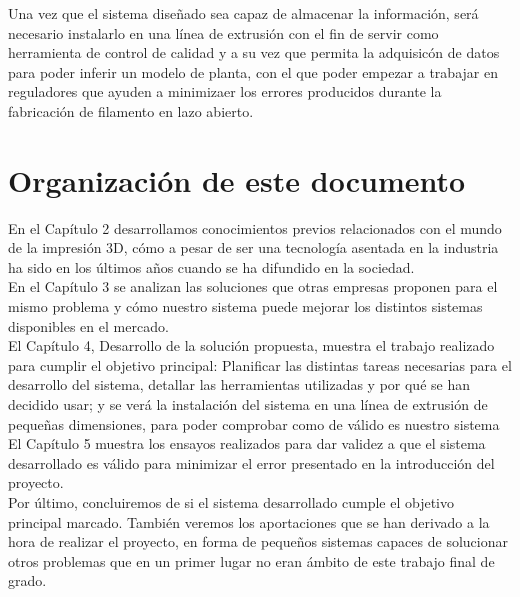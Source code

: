 Una vez que el sistema diseñado sea capaz de almacenar la información, será necesario instalarlo en una línea de extrusión con el fin de servir como herramienta de control de calidad y a su vez que permita la adquisicón de datos para poder inferir un modelo de planta, con el que poder empezar a trabajar en reguladores que ayuden a minimizaer los errores producidos durante la fabricación de filamento en lazo abierto.\\
\newpage
\section{Organización de este documento}
\label{sec:organizacion}

En el Capítulo 2 desarrollamos conocimientos previos relacionados con el mundo de la impresión 3D, cómo a pesar de ser una tecnología asentada en la industria ha sido en los últimos años cuando se ha difundido en la sociedad.\\

En el Capítulo 3 se analizan las soluciones que otras empresas proponen para el mismo problema y cómo nuestro sistema puede mejorar los distintos sistemas disponibles en el mercado.\\

El Capítulo 4, Desarrollo de la solución propuesta, muestra el trabajo realizado para cumplir el objetivo principal: Planificar las distintas tareas necesarias para el desarrollo del sistema, detallar las herramientas utilizadas y por qué se han decidido usar; y se verá la instalación del sistema en una línea de extrusión de pequeñas dimensiones, para poder comprobar como de válido es nuestro sistema\\

El Capítulo 5 muestra los ensayos realizados para dar validez a que el sistema desarrollado es válido para minimizar el error presentado en la introducción del proyecto.\\

Por último, concluiremos de si el sistema desarrollado cumple el objetivo principal marcado. También veremos los aportaciones que se han derivado a la hora de realizar el proyecto, en forma de pequeños sistemas capaces de solucionar otros problemas que en un primer lugar no eran ámbito de este trabajo final de grado.